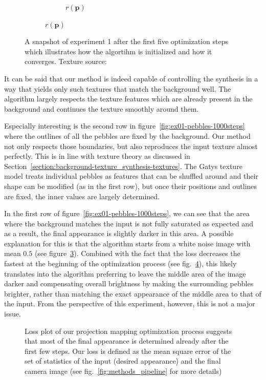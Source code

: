 \begin{figure}[]
\begin{subfigure}{\textwidth}
\begin{subfigure}{0.24\textwidth}
            \caption{\(r(\bm{p})\)}
            \label{fig:ex01-pebbles-5steps-threshold_proj}
        \end{subfigure}
    \end{subfigure}
    \caption{A snapshot of experiment 1 after the first five optimization steps which illustrates how the algortihm is initialized and how it converges. Texture source: \citet{Gatys2015}}
    \label{fig:ex01-pebbles-5steps}
\end{figure}

It can be said that our method is indeed capable of controlling the synthesis in a way that yields only such textures that match the background well. The algorithm largely respects the texture features which are already present in the background and continues the texture smoothly around them.

Especially interesting is the second row in figure~\ref{fig:ex01-pebbles-1000steps} where the outlines of all the pebbles are fixed by the background. Our method not only respects those boundaries, but also reproduces the input texture almost perfectly. This is in line with texture theory as discussed in Section~\ref{section:background-texture_synthesis-textures}. The Gatys texture model treats individual pebbles as features that can be shuffled around and their shape can be modified (as in the first row), but once their positions and outlines are fixed, the inner values are largely determined.

In the first row of figure~\ref{fig:ex01-pebbles-1000steps}, we can see that the area where the background matches the input is not fully saturated as expected and as a result, the final appearance is slightly darker in this area. A possible explanation for this is that the algorithm starts from a white noise image with mean \(0.5\) (see figure~\ref{fig:ex01-pebbles-5steps}). Combined with the fact that the loss decreases the fastest at the beginning of the optimization process (see fig.~\ref{fig:ex01-loss_plot}), this likely translates into the algorithm preferring to leave the middle area of the image darker and compensating overall brightness by making the surrounding pebbles brighter, rather than matching the exact appearance of the middle area to that of the input. From the perspective of this experiment, however, this is not a major issue.

\begin{figure}[ht]
    \centering
    \def\svgwidth{0.8\textwidth}
    
    \caption{Loss plot of our projection mapping optimization process suggests that most of the final appearance is determined already after the first few steps. Our loss is defined as the mean square error of the set of statistics of the input (desired appearance) and the final camera image (see fig.~\ref{fig:methods_pipeline} for more details)}
    \label{fig:ex01-loss_plot}
\end{figure}

